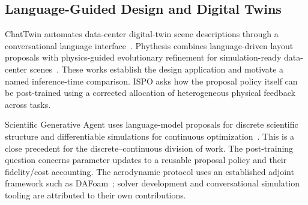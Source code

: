 \subsection{Language-Guided Design and Digital Twins}
ChatTwin automates data-center digital-twin scene descriptions through a conversational language interface~\cite{li2023chattwin}. Phythesis combines language-driven layout proposals with physics-guided evolutionary refinement for simulation-ready data-center scenes~\cite{li2025phythesis}. These works establish the design application and motivate a named inference-time comparison. ISPO asks how the proposal policy itself can be post-trained using a corrected allocation of heterogeneous physical feedback across tasks.

Scientific Generative Agent uses language-model proposals for discrete scientific structure and differentiable simulations for continuous optimization~\cite{ma2024sga}. This is a close precedent for the discrete--continuous division of work. The post-training question concerns parameter updates to a reusable proposal policy and their fidelity/cost accounting. The aerodynamic protocol uses an established adjoint framework such as DAFoam~\cite{he2020dafoam}; solver development and conversational simulation tooling are attributed to their own contributions.
